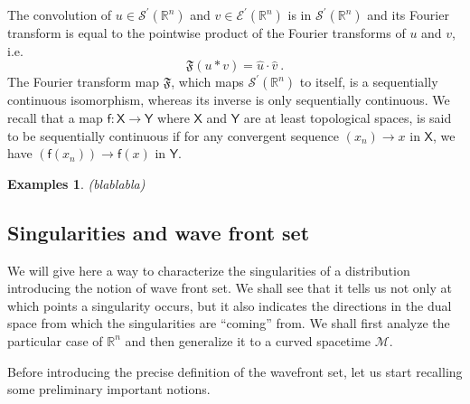 \documentclass[11pt]{book}
\newcommand{\hilight}[1]{\colorbox{yellow!80!black}{#1}}
\newcommand{\Ecal}{\mathcal{E}}
\newcommand{\Mcal}{\mathcal{M}}
\newcommand{\Scal}{\mathcal{S}}
\newcommand{\Rbb}{\mathbb{R}}
\newcommand{\Frak}{\mathfrak{F}}
\newcommand{\Xsf}{\mathsf{X}}
\newcommand{\Ysf}{\mathsf{Y}}
\newcommand{\fsf}{\mathsf{f}}
\theoremstyle{break}
\newtheorem{examples}{Examples}[chapter]
\begin{document}
The convolution of $u \in \Scal^\prime(\Rbb^n)$ and $v\in \Ecal^\prime(\Rbb^n)$ is in $\Scal^\prime(\Rbb^n)$ and its Fourier transform is equal to the pointwise product of the Fourier transforms of $u$ and $v$, i.e.
%
\begin{equation*}
\Frak(u \ast v) = \hat{u} \cdot \hat{v} \ .
\end{equation*}
%
The Fourier transform map $\Frak$, which maps $\Scal^\prime(\Rbb^n)$ to itself, is a sequentially continuous isomorphism, whereas its inverse is only sequentially continuous. We recall that a map $\fsf : \Xsf \to \Ysf$ where $\Xsf$ and $\Ysf$ are at least topological spaces, is said to be sequentially continuous if for any convergent sequence $(x_n) \to x$ in $\Xsf$, we have $(\fsf(x_n)) \to \fsf(x)$ in $\Ysf$. 


\begin{examples}
\hilight{(blablabla)}
\end{examples}


\subsection{Singularities and wave front set}\label{p:SING_WF}


We will give here a way to characterize the singularities of a distribution introducing the notion of wave front set. We shall see that it tells us not only at which points a singularity occurs, but it also indicates the directions in the dual space from which the singularities are ``coming'' from. We shall first analyze the particular case of $\Rbb^n$ and then generalize it to a curved spacetime $\Mcal$. 


Before introducing the precise definition of the wavefront set, let us start recalling some preliminary important notions.
\end{document}
